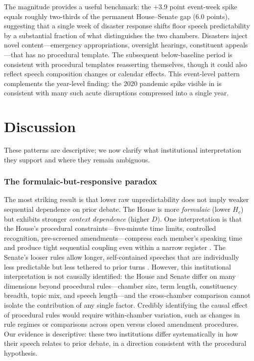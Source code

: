 \documentclass[12pt]{article}
\newcommand{\Hc}{H_c}
\newcommand{\DI}{\mathit{D}}
\begin{document}
The magnitude provides a useful benchmark: the +3.9 point event-week spike equals roughly two-thirds of the permanent House--Senate gap (6.0 points), suggesting that a single week of disaster response shifts floor speech predictability by a substantial fraction of what distinguishes the two chambers. Disasters inject novel content---emergency appropriations, oversight hearings, constituent appeals---that has no procedural template. The subsequent below-baseline period is consistent with procedural templates reasserting themselves, though it could also reflect speech composition changes or calendar effects. This event-level pattern complements the year-level finding: the 2020 pandemic spike visible in  is consistent with many such acute disruptions compressed into a single year.


\section{Discussion}

These patterns are descriptive; we now clarify what institutional interpretation they support and where they remain ambiguous.

\subsubsection*{The formulaic-but-responsive paradox} The most striking result is that lower raw unpredictability does not imply weaker sequential dependence on prior debate. The House is more \textit{formulaic} (lower $\Hc$) but exhibits stronger \textit{context dependence} (higher $\DI$). One interpretation is that the House's procedural constraints---five-minute time limits, controlled recognition, pre-screened amendments---compress each member's speaking time and produce tight sequential coupling even within a narrow register \citep{perssonTabellini2003, jenkins2006}. The Senate's looser rules allow longer, self-contained speeches that are individually less predictable but less tethered to prior turns \citep{lee2009}. However, this institutional interpretation is not causally identified: the House and Senate differ on many dimensions beyond procedural rules---chamber size, term length, constituency breadth, topic mix, and speech length---and the cross-chamber comparison cannot isolate the contribution of any single factor. Credibly identifying the causal effect of procedural rules would require within-chamber variation, such as changes in rule regimes or comparisons across open versus closed amendment procedures. Our evidence is descriptive: these two institutions differ systematically in how their speech relates to prior debate, in a direction consistent with the procedural hypothesis.
\end{document}

